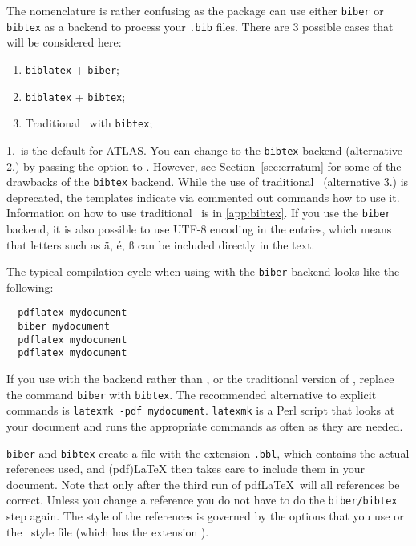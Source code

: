 \documentclass[REPORT=false, UKenglish]{atlasdoc}
\begin{document}
The nomenclature is rather confusing as the package  can use
either \texttt{biber} or \texttt{bibtex} as a backend to process your \texttt{.bib} files.
There are 3 possible cases that will be considered here:
\begin{enumerate}\setlength{\itemsep}{0pt}\setlength{\parskip}{0pt}
  \item \texttt{biblatex} + \texttt{biber};
  \item \texttt{biblatex} + \texttt{bibtex};
  \item Traditional \BibTeX\ with \texttt{bibtex};
\end{enumerate}
 1.\ is the default for ATLAS\@.
You can change to the \texttt{bibtex} backend (alternative 2.) by passing the option
 to .
However, see Section~\ref{sec:erratum} for some of the drawbacks of the \texttt{bibtex} backend.
While the use of traditional \BibTeX\ (alternative 3.) is deprecated,
the templates indicate via commented out commands how to use it.
Information on how to use traditional \BibTeX\ is in \cref{app:bibtex}.
If you use the \texttt{biber} backend, it is also possible to use UTF-8 encoding in the entries, which means that letters such as
ä, é, ß can be included directly in the text.

The typical compilation cycle when using  with the \texttt{biber} backend
looks like the following:
%
\begin{verbatim}
  pdflatex mydocument
  biber mydocument
  pdflatex mydocument
  pdflatex mydocument
\end{verbatim}
If you use  with the backend  rather than ,
or the traditional version of \BibTeX{},
replace the command \texttt{biber} with \texttt{bibtex}.
The recommended alternative to explicit commands is \texttt{latexmk -pdf mydocument}.
\texttt{latexmk} is a Perl script that looks at your document and runs the appropriate
commands as often as they are needed.

\texttt{biber} and \texttt{bibtex} create a file with the extension \texttt{.bbl}, which
contains the actual references used, and (pdf)\LaTeX{} then takes care to include them in your document.
Note that only after the third run of pdf\LaTeX\ will all references be correct.
Unless you change a reference you do not have to do the \texttt{biber/bibtex} step again.
The style of the references is governed by the  options that you
use or the \BibTeX\ style file (which has the extension ).
\end{document}
